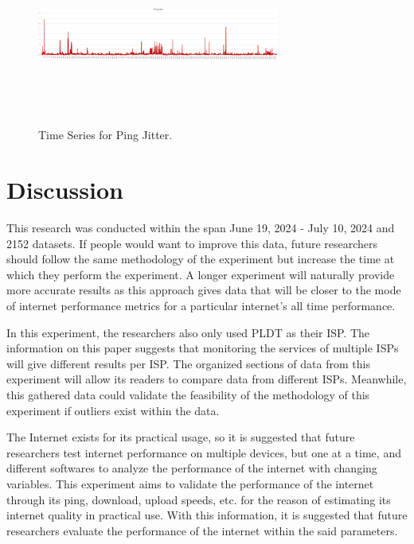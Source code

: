 \documentclass[conference]{IEEEtran}
\begin{document}
\begin{figure}[!htbp]
    \centerline{\includegraphics[width=8cm,height=6cm,keepaspectratio]{Figures/Picture8.png}}
    \caption{Time Series for Ping Jitter.}
    \label{fig6}
\end{figure}

\newpage

\section{Discussion}

This research was conducted within the span June 19, 2024 - July 10, 2024 and 2152 datasets. If people would want to improve this data, future researchers should follow the same methodology of the experiment but increase the time at which they perform the experiment. A longer experiment will naturally provide more accurate results as this approach gives data that will be closer to the mode of internet performance metrics for a particular internet’s all time performance. 

In this experiment, the researchers also only used PLDT as their ISP. The information on this paper suggests that monitoring the services of multiple ISPs will give different results per ISP. The organized sections of data from this experiment will allow its readers to compare data from different ISPs. Meanwhile, this gathered data could validate the feasibility of the methodology of this experiment if outliers exist within the data. 

The Internet exists for its practical usage, so it is suggested that future researchers test internet performance on multiple devices, but one at a time, and different softwares to analyze the performance of the internet with changing variables. This experiment aims to validate the performance of the internet through its ping, download, upload speeds, etc. for the reason of estimating its internet quality in practical use. With this information, it is suggested that future researchers evaluate the performance of the internet within the said parameters.
\end{document}
